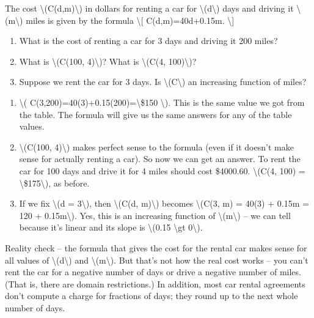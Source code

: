 The cost \textbackslash{}(C(d,m)\textbackslash{}) in dollars for renting
a car for \textbackslash{}(d\textbackslash{}) days and driving it
\textbackslash{}(m\textbackslash{}) miles is given by the formula
\textbackslash{}{[} C(d,m)=40d+0.15m. \textbackslash{}{]}

\begin{enumerate}
\tightlist
\item
  What is the cost of renting a car for 3 days and driving it 200 miles?
\item
  What is \textbackslash{}(C(100, 4)\textbackslash{})? What is
  \textbackslash{}(C(4, 100)\textbackslash{})?
\item
  Suppose we rent the car for 3 days. Is
  \textbackslash{}(C\textbackslash{}) an increasing function of miles?
\end{enumerate}

\begin{enumerate}
\tightlist
\item
  \textbackslash{}( C(3,200)=40(3)+0.15(200)=\textbackslash{}\$150
  \textbackslash{}). This is the same value we got from the table. The
  formula will give us the same answers for any of the table values.
\item
  \textbackslash{}(C(100, 4)\textbackslash{}) makes perfect sense to the
  formula (even if it doesn't make sense for actually renting a car). So
  now we can get an answer. To rent the car for 100 days and drive it
  for 4 miles should cost \$4000.60. \textbackslash{}(C(4, 100) =
  \textbackslash{}\$175\textbackslash{}), as before.
\item
  If we fix \textbackslash{}(d = 3\textbackslash{}), then
  \textbackslash{}(C(d, m)\textbackslash{}) becomes
  \textbackslash{}(C(3, m) = 40(3) + 0.15m = 120 +
  0.15m\textbackslash{}). Yes, this is an increasing function of
  \textbackslash{}(m\textbackslash{}) -- we can tell because it's linear
  and its slope is \textbackslash{}(0.15 \textbackslash{}gt
  0\textbackslash{}).
\end{enumerate}

Reality check -- the formula that gives the cost for the rental car
makes sense for all values of \textbackslash{}(d\textbackslash{}) and
\textbackslash{}(m\textbackslash{}). But that's not how the real cost
works -- you can't rent the car for a negative number of days or drive a
negative number of miles. (That is, there are domain restrictions.) In
addition, most car rental agreements don't compute a charge for
fractions of days; they round up to the next whole number of days.

